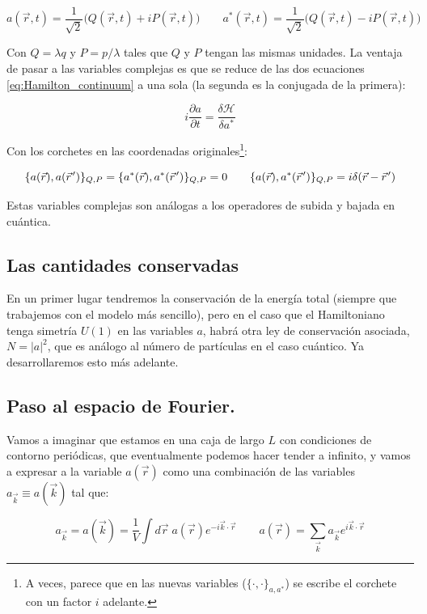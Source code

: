 \begin{equation}
	a(\vec r,t)=\frac{1}{\sqrt{2}}\big(Q(\vec r,t)+iP(\vec r,t)\big) \qquad a^*(\vec r,t)=\frac{1}{\sqrt{2}}\big(Q(\vec r,t)-iP(\vec r,t)\big)
\end{equation}

Con $Q=\lambda q$ y $P=p / \lambda$ tales que $Q$ y $P$ tengan las mismas unidades. La ventaja de pasar a las variables complejas es que se reduce de las dos ecuaciones \eqref{eq:Hamilton_continuum} a una sola (la segunda es la conjugada de la primera):

\begin{equation}
	i\frac{\partial a}{\partial t} = \frac{\delta \mathcal{H}}{\delta a^*}
\end{equation}

Con los corchetes en las coordenadas originales\footnote{A veces, parece que en las nuevas variables ($\{\cdot,\cdot\}_{a,a^*}$) se escribe el corchete con un factor $i$ adelante.}:

\begin{equation}
	\{a(\vec r), a(\pvec r')\}_{Q,P} = \{a^*(\vec r), a^*(\pvec r')\}_{Q,P} = 0 \qquad \{a(\vec r), a^*(\pvec r')\}_{Q,P} = i\delta(\vec r - \pvec r')
\end{equation}

Estas variables complejas son análogas a los operadores de subida y bajada en cuántica. 

\subsection*{Las cantidades conservadas}
En un primer lugar tendremos la conservación de la energía total (siempre que trabajemos con el modelo más sencillo), pero en el caso que el Hamiltoniano tenga simetría $U(1)$ en las variables $a$, habrá otra ley de conservación asociada, $N=|a|^2$, que es análogo al número de partículas en el caso cuántico. Ya desarrollaremos esto más adelante. 

\subsection*{Paso al espacio de Fourier.}
Vamos a imaginar que estamos en una caja de largo $L$ con condiciones de contorno periódicas, que eventualmente podemos hacer tender a infinito, y vamos a expresar a la variable $a(\vec r)$ como una combinación de las variables $a_{\vec k} \equiv a(\vec k)$ tal que:

\begin{equation}
	a_{\vec k} = a(\vec k) = \frac{1}{V}\int d\vec r\;a(\vec r)e^{-i\vec k\cdot\vec r} \qquad a(\vec r) = \sum_{\vec k} a_{\vec k} e^{i\vec k\cdot\vec r}
\end{equation}

